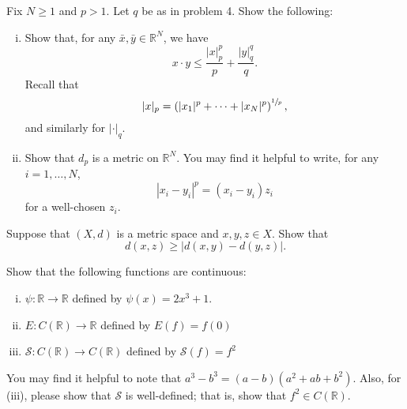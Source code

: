 \documentclass[11pt,letterpaper]{article}
\newcommand{\R}{\mathbb{R}}
\newcommand{\cS}{\mathcal S}
\newenvironment{prob}[1]
  {\renewcommand\theinnerprob{#1}\innerprob}
  {\endinnerprob}
\newenvironment{solution}
  {\renewcommand\qedsymbol{}\begin{proof}[Solution]}
  {\end{proof}\bigskip}
\begin{document}
\begin{prob}{5}  %
Fix $N\geq 1$ and $p>1$.  Let $q$ be as in problem 4. Show the following:
\begin{enumerate}[(i)]

	\item Show that, for any $\bar x, \bar y \in \R^N$, we have
		\[
			x\cdot y \leq \frac{|x|_p^p}{p} + \frac{|y|_q^q}{q}.
		\]
		Recall that
		\[
			|x|_p = \left(|x_1|^p + \cdots + |x_N|^p\right)^{\sfrac1p},
		\]
		and similarly for $|\cdot|_q$.  
	
	\item Show that $d_p$ is a metric on $\R^N$.  You may find it helpful to write, for any $i=1,\dots, N$,
		\[
			|x_i - y_i|^p = (x_i - y_i) z_i
		\]
		for a well-chosen $z_i$.
	
\end{enumerate}
\end{prob}




\begin{prob}{6}  %
Suppose that $(X,d)$ is a metric space and $x,y,z\in X$.  Show that
\[
	d(x,z) \geq |d(x,y) - d(y,z)|.
\]
\end{prob}





\begin{prob}{7}  %
Show that the following functions are continuous:
\begin{enumerate}[(i)]

	\item $\psi: \R \to \R$ defined by $\psi(x) = 2x^3 + 1$.
	
	\item $E: C(\R) \to \R$ defined by $E(f) = f(0)$

	\item $\cS: C(\R) \to C(\R)$ defined by $\cS(f) = f^2$
	
\end{enumerate}
You may find it helpful to note that $a^3 - b^3 = (a-b) (a^2 + ab + b^2)$.  Also, for (iii), please show that $\cS$ is well-defined; that is, show that $f^2 \in C(\R)$.
\end{prob}
\end{document}
